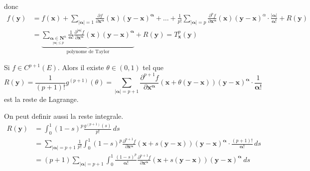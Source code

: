donc
\begin{align*}
f(\boldsymbol{y}) & = f(\boldsymbol{x})+\sum _{|\boldsymbol{\alpha}|=1}\frac{ \partial f }{ \partial \boldsymbol{x}^{\boldsymbol{\alpha}} } (\boldsymbol{x})(\boldsymbol{y}-\boldsymbol{x})^{\boldsymbol{\alpha}}+\dots +\frac{1}{p!}\sum _{|\boldsymbol{\alpha}|=p} \frac{ \partial^{p}f }{ \partial \boldsymbol{x}^{\boldsymbol{\alpha}} } (\boldsymbol{x})(\boldsymbol{y}-\boldsymbol{x})^{\alpha}\cdot \frac{|\boldsymbol{\alpha}|}{\boldsymbol{\alpha}!}+R(\boldsymbol{y}) \\
 & = \underbrace{ \sum _{\underset{|\boldsymbol{\alpha}|\le p}{\boldsymbol{\alpha}\in \mathbf{N}^{n}}} \frac{1}{\boldsymbol{\alpha}!} \frac{ \partial^{|\boldsymbol{\alpha}|}f }{ \partial \boldsymbol{x}^{\boldsymbol{\alpha}} }(\boldsymbol{x})(\boldsymbol{y}-\boldsymbol{x})^{\boldsymbol{\alpha}} }_{ \text{polynome de Taylor} }+R(\boldsymbol{y})=T_{\boldsymbol{x}}^{p}(\boldsymbol{y}) 
\end{align*}


    Si $f\in C^{p+1}(E)$. Alors il existe $\theta \in(0,1)$ tel que 
    $$
    R(\boldsymbol{y})= \frac{1}{(p+1)!}g^{(p+1)}(\theta)=\sum _{|\boldsymbol{\alpha}|=p+1} \frac{ \partial^{p+1}f }{ \partial \boldsymbol{x}^{\boldsymbol{\alpha}} } (\boldsymbol{x}+\theta(\boldsymbol{y}-\boldsymbol{x}))(\boldsymbol{y}-\boldsymbol{x})^{\boldsymbol{\alpha}} \cdot \frac{1}{\boldsymbol{\alpha}!}
    $$
    est la reste de Lagrange.

    On peut definir aussi la reste integrale.
    \begin{align*}
        R(\boldsymbol{y}) & =\int_{0}^{1} (1-s)^{p} \frac{g^{(p+1)}(s)}{p!} \, ds \\
     & = \sum _{|\boldsymbol{\alpha}|=p+1}\frac{1}{p!}\int_{0}^{1} (1-s)^{p} \frac{ \partial^{p+1}f }{ \partial \boldsymbol{x}^{\boldsymbol{\alpha}} } (\boldsymbol{x}+s(\boldsymbol{y}-\boldsymbol{x}))(\boldsymbol{y}-\boldsymbol{x})^{\boldsymbol{\alpha}}\cdot \frac{(p+1)!}{\boldsymbol{\alpha}!} \, ds \\
     & =(p+1)\sum _{|\boldsymbol{\alpha}|=p+1} \int_{0}^{1} \frac{(1-s)^{p}}{\boldsymbol{\alpha}!} \frac{ \partial^{p+1}f }{ \partial \boldsymbol{x}^{\boldsymbol{\alpha}} } (\boldsymbol{x}+s(\boldsymbol{y}-\boldsymbol{x}))(\boldsymbol{y}-\boldsymbol{x})^{\boldsymbol{\alpha}}~ds 
    \end{align*}
    
